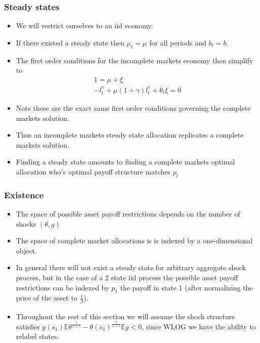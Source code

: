 \documentclass{beamer}
\newcommand{\EE}{\mathbb E}
\begin{document}
\begin{frame}
 \frametitle{Steady states}
\begin{itemize}
	\item  We will restrict ourselves to an iid economy.
	\item  If there existed a steady state then $\mu_t = \mu$ for all periods and $b_t = b$.
	\item  The first order conditions for the incomplete markets economy then simplify to
	\begin{align*}
		 1 = \mu+ \xi\\
		-l_t^\gamma + \mu(1+\gamma)l_t^\gamma +\theta_t\xi = 0
	\end{align*}
	\item  Note these are the exact same first order conditions governing the complete markets solution.
	\item  Thus an incomplete markets steady state allocation replicates a complete markets solution. 
	\item  Finding a steady state amounts to finding a complete markets optimal allocation who's optimal payoff structure matches $p_t$
\end{itemize}
\end{frame}

\begin{frame}
 \frametitle{Existence }
 \begin{itemize}
	\item The space of possible asset payoff restrictions depends on the number of shocks $(\theta,g)$
	\item The space of complete market allocations is is indexed by a one-dimensional object.
	\item  In general there will not exist a steady state for arbitrary aggregate shock process, but in the case of a 2 state iid process the possible asset payoff restrictions can be indexed by $p_1$ the payoff in state 1 (after normalizing the price of the asset to $\frac1\beta$).
	\item  Throughout the rest of this section we will assume the shock structure satisfies $g(s_1)\EE\theta^\frac{\gamma}{1+\gamma}-\theta(s_1)^\frac\gamma{1+\gamma}\EE g < 0$, since WLOG we have the ability to relabel states.
\end{itemize}
\end{frame}
\end{document}
